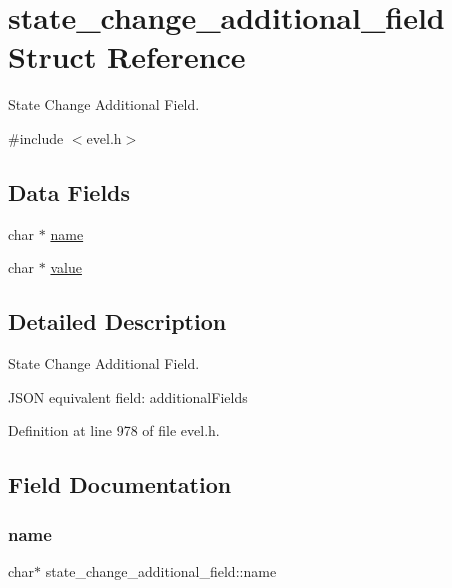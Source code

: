 \hypertarget{structstate__change__additional__field}{}\section{state\+\_\+change\+\_\+additional\+\_\+field Struct Reference}
\label{structstate__change__additional__field}


State Change Additional Field.  




{\ttfamily \#include $<$evel.\+h$>$}

\subsection*{Data Fields}
\begin{DoxyCompactItemize}
\item 
char $\ast$ \hyperlink{structstate__change__additional__field_a6ea68aa70d5a064648689827374113f2}{name}
\item 
char $\ast$ \hyperlink{structstate__change__additional__field_a13d1bd59f934124cf2a95a3851f17929}{value}
\end{DoxyCompactItemize}


\subsection{Detailed Description}
State Change Additional Field. 

J\+S\+ON equivalent field\+: additional\+Fields 

Definition at line 978 of file evel.\+h.



\subsection{Field Documentation}
\hypertarget{structstate__change__additional__field_a6ea68aa70d5a064648689827374113f2}{}\label{structstate__change__additional__field_a6ea68aa70d5a064648689827374113f2} 
\subsubsection{\texorpdfstring{name}{name}}
{\footnotesize\ttfamily char$\ast$ state\+\_\+change\+\_\+additional\+\_\+field\+::name}




